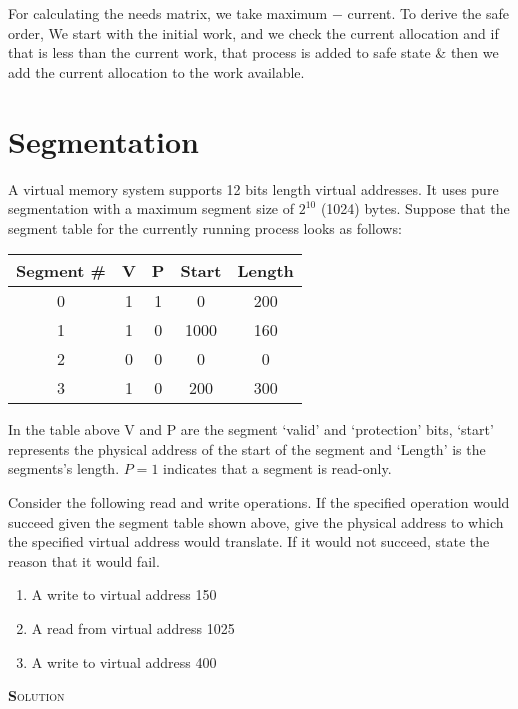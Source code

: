 \documentclass{article}
\newcommand{\smallcaps}[1]{\textsc{\textbf #1}\\}
\begin{document}
\begin{multicols}{2}
    For calculating the needs matrix, we take maximum $-$ current. To derive the safe order, We
    start with the initial work, and we check the current allocation and if that is less than the
    current work, that process is added to safe state \& then we add the current allocation to the
    work available.

    \section*{Segmentation}

    A virtual memory system supports 12 bits length virtual addresses. It uses pure segmentation
    with a maximum segment size of $2^{10}$ (1024) bytes. Suppose that the segment table for the
    currently running process looks as follows:

    \begin{tabular}{|c|c|c|c|c|}
      \hline
      Segment \# & V & P & Start & Length \\
      \hline
      0 & 1 & 1 & 0 & 200 \\
      \hline
      1 & 1 & 0 & 1000 & 160 \\
      \hline
      2 & 0 & 0 & 0 & 0 \\
      \hline
      3 & 1 & 0 & 200 & 300 \\
      \hline
    \end{tabular}

    In the table above V and P are the segment `valid' and `protection' bits, `start' represents the
    physical address of the start of the segment and `Length' is the segments's length. $P = 1$
    indicates that a segment is read-only.

    Consider the following read and write operations. If the specified operation would succeed given
    the segment table shown above, give the physical address to which the specified virtual address
    would translate. If it would not succeed, state the reason that it would fail.

    \begin{enumerate}
      \item A write to virtual address 150
      \item A read from virtual address 1025
      \item A write to virtual address 400
    \end{enumerate}

    \smallcaps{Solution}


\end{multicols}
\end{document}
